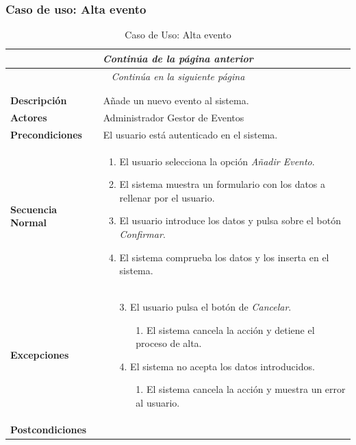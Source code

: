 \subsubsection*{Caso de uso: Alta evento }
\begin{longtable}{| p{4cm} | p{10cm} |}
\endfirsthead
\multicolumn{2}{c}{\textit{Continúa de la página anterior}}\\[12pt]
\hline
\endhead
\hline
\multicolumn{2}{c}{\textit{Continúa en la siguiente página}} \\
\endfoot
\hline
\caption{Caso de Uso: Alta evento}\label{fig:1}\\
\endlastfoot


\hline
\multicolumn{2}{|c|}{\textbf{CU$<$38$>$ - Alta Evento}} \\

\hline
\textbf{Descripción} &
Añade un nuevo evento al sistema.\\

\hline
\textbf{Actores} &
Administrador\newline
Gestor de Eventos\\

\hline
\textbf{Precondiciones} &
El usuario está autenticado en el sistema.\\

\hline
\textbf{Secuencia Normal} &\mbox{}\par\vspace{-\baselineskip}
\begin{enumerate}[leftmargin=0.7cm, topsep=0.1cm]
\item El usuario selecciona la opción \textit{Añadir Evento}.
\item El sistema muestra un formulario con los datos a rellenar por el usuario.
\item El usuario introduce los datos y pulsa sobre el botón \textit{Confirmar}.
\item El sistema comprueba los datos y los inserta en el sistema.
\end{enumerate}


\\
\hline
\textbf{Excepciones} &\mbox{}\par\vspace{-\baselineskip}
\begin{enumerate}[leftmargin=0.9cm, topsep=0.1cm]
\item[3.] El usuario pulsa el botón de \textit{Cancelar}.
	\begin{itemize}
	\item[1.] El sistema cancela la acción y detiene el proceso de alta.
	\end{itemize}
\item[4.] El sistema no acepta los datos introducidos.
	\begin{itemize}
	\item[1.] El sistema cancela la acción y muestra un error al usuario.
	\end{itemize}
\end{enumerate}
\\

\hline
\textbf{Postcondiciones} & \\
\hline
\end{longtable}



